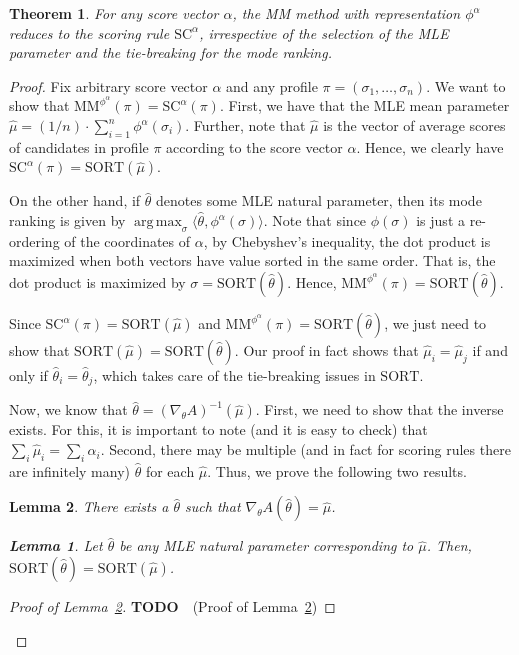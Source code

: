 \documentclass[10pt,letterpaper]{article}
\newcommand{\grad}{\nabla}
\newcommand{\scr}{{\text{SC}}}
\newcommand{\mm}{\text{MM}}
\newcommand{\sca}{{\scr^{\alpha}}}
\newcommand{\sort}{\text{SORT}}
\newcommand{\phia}{\phi^{\alpha}}
\newcommand{\mmphia}{\mm^{\phia}}
\newcommand{\muhat}{\hat{\mu}}
\newcommand{\that}{\hat{\theta}}
\DeclareMathOperator*{\argmax}{arg\,max}
\newtheorem{theorem}{Theorem}
\newtheorem{lemma}{Lemma}
\begin{document}
\begin{theorem}
For any score vector $\alpha$, the MM method with representation $\phia$ reduces to the scoring rule $\sca$, irrespective of the selection of the MLE parameter and the tie-breaking for the mode ranking.
\label{thm:recover-scoring}
\end{theorem}
\begin{proof}
Fix arbitrary score vector $\alpha$ and any profile $\pi = (\sigma_1,\ldots,\sigma_n)$. We want to show that $\mmphia(\pi) = \sca(\pi)$. First, we have that the MLE mean parameter $\muhat = (1/n) \cdot \sum_{i=1}^n \phia(\sigma_i)$. Further, note that $\muhat$ is the vector of average scores of candidates in profile $\pi$ according to the score vector $\alpha$. Hence, we clearly have $\sca(\pi) = \sort(\muhat)$.

On the other hand, if $\that$ denotes some MLE natural parameter, then its mode ranking is given by $\argmax_{\sigma} \langle \that, \phia(\sigma) \rangle$. Note that since $\phi(\sigma)$ is just a re-ordering of the coordinates of $\alpha$, by Chebyshev's inequality, the dot product is maximized when both vectors have value sorted in the same order. That is, the dot product is maximized by $\sigma = \sort(\that)$. Hence, $\mmphia(\pi) = \sort(\that)$. 

Since $\sca(\pi) = \sort(\muhat)$ and $\mmphia(\pi) = \sort(\that)$, we just need to show that $\sort(\muhat) = \sort(\that)$. Our proof in fact shows that $\muhat_i = \muhat_j$ if and only if $\that_i = \that_j$, which takes care of the tie-breaking issues in $\sort$. 

Now, we know that $\that =  (\grad_{\theta} A)^{-1} (\muhat)$. First, we need to show that the inverse exists. For this, it is important to note (and it is easy to check) that $\sum_i \muhat_i = \sum_i \alpha_i$. Second, there may be multiple (and in fact for scoring rules there are infinitely many) $\that$ for each $\muhat$. Thus, we prove the following two results.

\begin{lemma}
There exists a $\that$ such that $\grad_{\theta} A (\that) = \muhat$. 
\label{lem:scoring-existence}

\begin{lemma}
Let $\that$ be \emph{any} MLE natural parameter corresponding to $\muhat$. Then, $\sort(\that) = \sort(\muhat)$.
\label{lem:muhat-that}
\end{lemma}

\end{lemma}
\begin{proof}[Proof of Lemma~\ref{lem:scoring-existence}]
{\bf TODO}~\qedhere~(Proof of Lemma~\ref{lem:scoring-existence})
\end{proof}



\end{proof}
\end{document}
